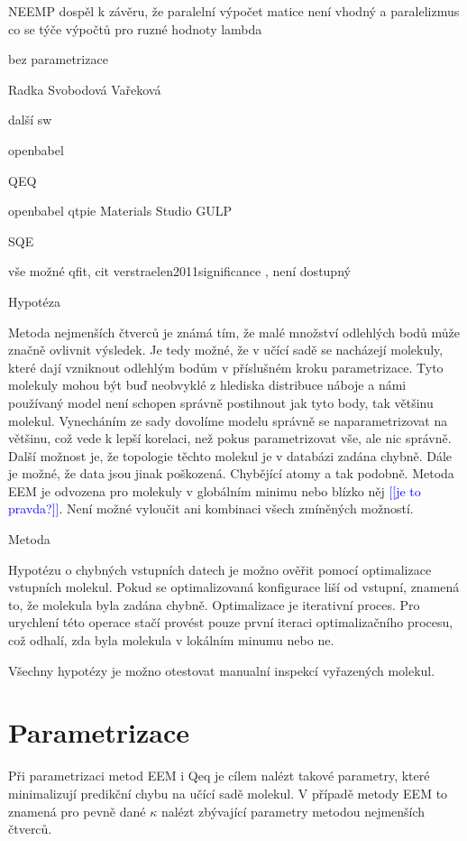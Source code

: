 \documentclass[
  color, %
  table, %
  lof,   %
  lot,   %
]{fithesis3}
\newcommand\todo[1]{\textcolor{blue}{[[#1]]}}
\begin{document}
NEEMP dospěl k závěru, že paralelní výpočet matice není vhodný a paralelizmus co se týče výpočtů pro ruzné hodnoty lambda

bez parametrizace

Radka Svobodová Vařeková 

další sw

openbabel

QEQ

openbabel
qtpie
Materials Studio
GULP



SQE

vše možné
qfit, cit verstraelen2011significance , není dostupný

Hypotéza

Metoda nejmenších čtverců je známá tím, že malé množství odlehlých bodů může značně ovlivnit výsledek. Je tedy možné, že v učící sadě se nacházejí molekuly, které dají vzniknout odlehlým bodům v příslušném kroku parametrizace. Tyto molekuly mohou být buď neobvyklé z hlediska distribuce náboje a námi používaný model není schopen správně postihnout jak tyto body, tak většinu molekul. Vynecháním ze sady dovolíme modelu správně se naparametrizovat na většinu, což vede k lepší korelaci, než pokus parametrizovat vše, ale nic správně. Další možnost je, že topologie těchto molekul je v databázi zadána chybně. Dále je možné, že data jsou jinak poškozená. Chybějící atomy a tak podobně. Metoda EEM je odvozena pro molekuly v globálním minimu nebo blízko něj \todo{je to pravda?}. Není možné vyloučit ani kombinaci všech zmíněných možností.

Metoda

Hypotézu o chybných vstupních datech je možno ověřit pomocí optimalizace vstupních molekul. Pokud se optimalizovaná konfigurace liší od vstupní, znamená to, že molekula byla zadána chybně. Optimalizace je iterativní proces. Pro urychlení této operace stačí provést pouze první iteraci optimalizačního procesu, což odhalí, zda byla molekula v lokálním minumu nebo ne.

Všechny hypotézy je možno otestovat manualní inspekcí vyřazených molekul.

\section{Parametrizace}

Při parametrizaci metod EEM i Qeq je cílem nalézt takové parametry, které minimalizují predikční chybu na učící sadě molekul. V případě metody EEM to znamená pro pevně dané $\kappa$ nalézt zbývající parametry metodou nejmenších čtverců.
\end{document}
